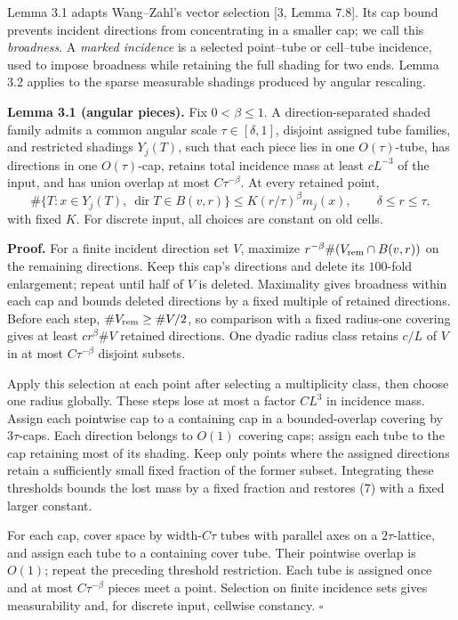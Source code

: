 \documentclass[
  11pt,
  a4paper,
]{article}
\begin{document}
Lemma 3.1 adapts Wang--Zahl's vector selection {[}3, Lemma 7.8{]}. Its
cap bound prevents incident directions from concentrating in a smaller
cap; we call this \emph{broadness}. A \emph{marked incidence} is a
selected point--tube or cell--tube incidence, used to impose broadness
while retaining the full shading for two ends. Lemma 3.2 applies to the
sparse measurable shadings produced by angular rescaling.

\textbf{Lemma 3.1 (angular pieces).} Fix \(0<\beta\le1\). A
direction-separated shaded family admits a common angular scale
\(\tau\in[\delta,1]\), disjoint assigned tube families, and restricted
shadings \(Y_j(T)\), such that each piece lies in one \(O(\tau)\)-tube,
has directions in one \(O(\tau)\)-cap, retains total incidence mass at
least \(cL^{-3}\) of the input, and has union overlap at most
\(C\tau^{-\beta}\). At every retained point, \[
 \#\{T:x\in Y_j(T),\ \operatorname{dir}T\in B(v,r)\}
 \le K(r/\tau)^\beta m_j(x),\qquad \delta\le r\le\tau,
\tag{7}\label{eq:7}
\] with fixed \(K\). For discrete input, all choices are constant on old
cells.

\textbf{Proof.} For a finite incident direction set \(V\), maximize
\(r^{-\beta}\#(V_{\rm rem}\cap B(v,r))\) on the remaining directions.
Keep this cap's directions and delete its \(100\)-fold enlargement;
repeat until half of \(V\) is deleted. Maximality gives broadness within
each cap and bounds deleted directions by a fixed multiple of retained
directions. Before each step, \(\#V_{\rm rem}\ge\#V/2\), so comparison
with a fixed radius-one covering gives at least \(cr^\beta\#V\) retained
directions. One dyadic radius class retains \(c/L\) of \(V\) in at most
\(C\tau^{-\beta}\) disjoint subsets.

Apply this selection at each point after selecting a multiplicity class,
then choose one radius globally. These steps lose at most a factor
\(CL^3\) in incidence mass. Assign each pointwise cap to a containing
cap in a bounded-overlap covering by \(3\tau\)-caps. Each direction
belongs to \(O(1)\) covering caps; assign each tube to the cap retaining
most of its shading. Keep only points where the assigned directions
retain a sufficiently small fixed fraction of the former subset.
Integrating these thresholds bounds the lost mass by a fixed fraction
and restores (7) with a fixed larger constant.

For each cap, cover space by width-\(C\tau\) tubes with parallel axes on
a \(2\tau\)-lattice, and assign each tube to a containing cover tube.
Their pointwise overlap is \(O(1)\); repeat the preceding threshold
restriction. Each tube is assigned once and at most \(C\tau^{-\beta}\)
pieces meet a point. Selection on finite incidence sets gives
measurability and, for discrete input, cellwise constancy. \(\square\)
\end{document}
